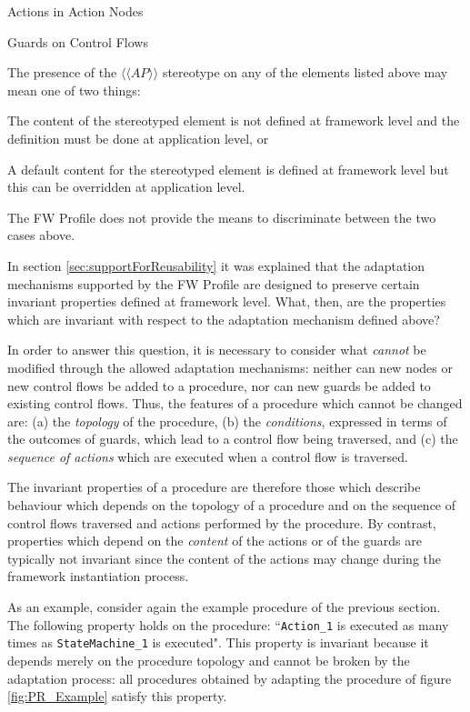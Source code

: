 \documentclass[definition]{../fwprofile}
\begin{document}
\begin{fw_itemize} 
\item Actions in Action Nodes
\item Guards on Control Flows
\end{fw_itemize}

The presence of the $\langle\langle AP \rangle\rangle$ stereotype on any of the elements listed above may mean one of two things:

\begin{fw_enumerate} 
\item The content of the stereotyped element is not defined at framework level and the
definition must be done at application level, or
\item A default content for the stereotyped element is defined at framework level but this
can be overridden at application level.
\end{fw_enumerate}

The FW Profile does not provide the means to discriminate between the two cases above.

In section \ref{sec:supportForReusability} it was explained that the adaptation mechanisms supported by the FW Profile are designed to preserve certain invariant properties defined at framework level. What, then, are the properties which are invariant with respect to the adaptation mechanism defined above?

In order to answer this question, it is necessary to consider what \emph{cannot} be modified through the allowed adaptation mechanisms: neither can new nodes or new control flows be added to a procedure, nor can new guards be added to existing control flows. Thus, the features of a procedure which cannot be changed are: (a) the \emph{topology} of the procedure, (b) the \emph{conditions}, expressed in terms of the outcomes of guards, which lead to a control flow being traversed, and (c) the \emph{sequence of actions} which are executed when a control flow is traversed.

The invariant properties of a procedure are therefore those which describe behaviour which depends on the topology of a procedure and on the sequence of control flows traversed and actions performed by the procedure. By contrast, properties which depend on the \emph{content} of the actions or of the guards are typically not invariant since the content of the actions may change during the framework instantiation process.

As an example, consider again the example procedure of the previous section. The following
property holds on the procedure: “\texttt{Action\_1} is executed as many times as 
\texttt{StateMachine\_1} is executed". This property is invariant because it depends merely on the procedure topology and cannot be broken by the adaptation process: all procedures obtained by adapting the procedure of figure \ref{fig:PR_Example} satisfy this property.
\end{document}
